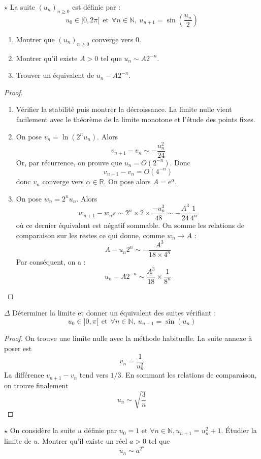 \documentclass[french,a4paper]{article}
\newcommand{\N}{\mathbb{N}}
\newcommand{\R}{\mathbb{R}}
\theoremstyle{plain}
\theoremstyle{definition}
\theoremstyle{remark}
\begin{document}
\begin{ex}{$\star$}
	La suite $(u_n)_{n\geqslant0}$ est définie par : $$u_0\in]0,2\pi[\ \ \text{et} \ \ \forall n\in\N,\ u_{n+1}=\sin\left(\frac{u_n}{2}\right)$$
	\begin{enumerate}
		\item Montrer que $(u_n)_{n\geqslant0}$ converge vers $0$.
		\item Montrer qu'il existe $A>0$ tel que $u_n\sim A2^{-n}$.
		\item Trouver un équivalent de $u_n-A2^{-n}$.
	\end{enumerate}
\end{ex}

\begin{proof}
	\begin{enumerate}
		\item Vérifier la stabilité puis montrer la décroissance. La limite nulle vient facilement avec le théorème de la limite monotone et l'étude des points fixes.
		\item On pose $v_n=\ln(2^nu_n)$. Alors $$v_{n+1}-v_n\sim-\frac{u_n^2}{24}$$ Or, par récurrence, on prouve que $u_n=O(2^{-n})$. Donc $$v_{n+1}-v_n=O(4^{-n})$$ donc $v_n$ converge vers $\alpha\in\R$. On pose alors $A=e^{\alpha}$.
		\item On pose $w_n=2^nu_n$. Alors $$w_{n+1}-w_ns\sim 2^n\times 2\times\frac{-u_n^3}{48}\sim-\frac{A^3}{24}\frac{1}{4^n}$$ où ce dernier équivalent est négatif sommable. On somme les relations de comparaison sur les restes ce qui donne, comme $w_n\to A$ : $$A-u_n2^n\sim-\frac{A^3}{18\times 4^n}$$ Par conséquent, on a : $$u_n-A2^{-n}\sim\frac{A^3}{18}\times\frac{1}{8^n}$$
	\end{enumerate}
\end{proof}

\begin{ex}{$\Delta$}
	Déterminer la limite et donner un équivalent des suites vérifiant : $$u_{0}\in]0,\pi[ \ \ \text{et} \ \ \forall n\in\N,\ u_{n+1}=\sin(u_n)$$
\end{ex}

\begin{proof}
	On trouve une limite nulle avec la méthode habituelle. La suite annexe à poser est $$v_n=\frac{1}{u_n^2}$$ La différence $v_{n+1}-v_n$ tend vers $1/3$. En sommant les relations de comparaison, on trouve finalement $$u_n\sim\sqrt{\frac{3}{n}}$$
\end{proof}

\begin{ex}{$\star$}
	On considère la suite $u$ définie par $u_0=1$ et $\forall n\in\N, u_{n+1}=u_n^2+1$. Étudier la limite de $u$. Montrer qu'il existe un réel $a>0$ tel que $$u_n\sim a^{2^n}$$
\end{ex}
\end{document}
